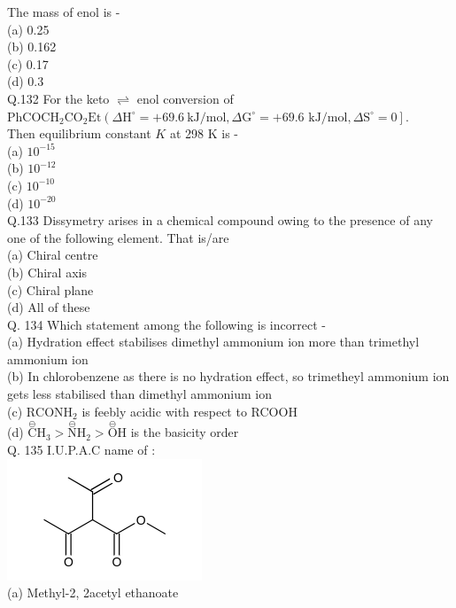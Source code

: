 \documentclass[10pt]{article}
\begin{document}
The mass of enol is -\\
(a) 0.25\\
(b) 0.162\\
(c) 0.17\\
(d) 0.3\\
Q.132 For the keto $\rightleftharpoons$ enol conversion of $\mathrm{PhCOCH}_{2} \mathrm{CO}_{2} \mathrm{Et}\left(\Delta \mathrm{H}^{\circ}=+69.6 \mathrm{~kJ} / \mathrm{mol}, \Delta \mathrm{G}^{\circ}=+69.6\right.$ $\left.\mathrm{kJ} / \mathrm{mol}, \Delta \mathrm{S}^{\circ}=0\right]$.\\
Then equilibrium constant $K$ at 298 K is -\\
(a) $10^{-15}$\\
(b) $10^{-12}$\\
(c) $10^{-10}$\\
(d) $10^{-20}$\\
Q.133 Dissymetry arises in a chemical compound owing to the presence of any one of the following element. That is/are\\
(a) Chiral centre\\
(b) Chiral axis\\
(c) Chiral plane\\
(d) All of these\\
Q. 134 Which statement among the following is incorrect -\\
(a) Hydration effect stabilises dimethyl ammonium ion more than trimethyl ammonium ion\\
(b) In chlorobenzene as there is no hydration effect, so trimetheyl ammonium ion gets less stabilised than dimethyl ammonium ion\\
(c) $\mathrm{RCONH}_{2}$ is feebly acidic with respect to RCOOH\\
(d) $\stackrel{\ominus}{\mathrm{C}} \mathrm{H}_{3}>\stackrel{\ominus}{\mathrm{N}} \mathrm{H}_{2}>\stackrel{\ominus}{\mathrm{O}} \mathrm{H}$ is the basicity order\\
Q. 135 I.U.P.A.C name of :\\
\includegraphics{smile-97f34c770bfe7576cb9494727c41e3834f87bf2b}\\
(a) Methyl-2, 2acetyl ethanoate\\
\end{document}
